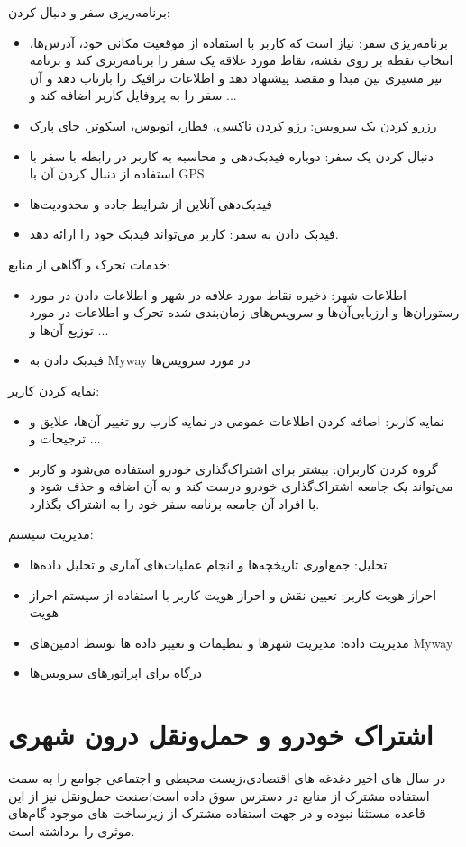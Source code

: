 برنامه‌ریزی سفر و دنبال کردن:
\begin{itemize}
\item
برنامه‌ریزی سفر: نیاز است که کاربر با استفاده از موقعیت مکانی خود، آدرس‌ها، انتخاب نقطه بر روی نقشه، نقاط مورد علاقه یک سفر را برنامه‌ریزی کند و برنامه نیز مسیری بین مبدا و مقصد پیشنهاد دهد و اطلاعات ترافیک را بازتاب دهد و  آن سفر را به پروفایل کاربر اضافه کند و ...
\item 
رزرو کردن یک سرویس: رزو کردن تاکسی، قطار، اتوبوس، اسکوتر، جای پارک 
\item
دنبال کردن یک سفر: دوباره فیدبک‌دهی و محاسبه به کاربر در رابطه با سفر با استفاده از دنبال کردن آن با GPS
\item
فیدبک‌دهی آنلاین از شرایط جاده و محدودیت‌ها
\item
فیدبک دادن به سفر: کاربر می‌تواند فیدبک خود را ارائه دهد.
\end{itemize}

خدمات تحرک و آگاهی از منابع: 
\begin{itemize}
\item
اطلاعات شهر: ذخیره نقاط مورد علافه در شهر و اطلاعات دادن در مورد رستوران‌ها و ارزیابی‌آن‌ها و سرویس‌های زمان‌بندی شده تحرک و اطلاعات در مورد توزیع آن‌ها و ...
\item
فیدبک دادن به Myway در مورد سرویس‌ها
\end{itemize}

نمایه کردن کاربر: 
\begin{itemize}
\item
نمایه کاربر: اضافه کردن اطلاعات عمومی در نمایه کارب رو تغییر آن‌ها، علایق و ترجیحات و ...
\item 
گروه کردن کاربران: بیشتر برای اشتراک‌گذاری خودرو استفاده می‌شود و کاربر می‌تواند یک جامعه اشتراک‌گذاری خودرو درست کند و به آن اضافه و حذف شود و با افراد آن جامعه برنامه سفر خود را به اشتراک بگذارد.
\end{itemize}

مدیریت سیستم:
\begin{itemize}
\item
تحلیل: جمع‌اوری تاریخچه‌ها و انجام عملیات‌های آماری و تحلیل داده‌ها 
\item
احراز هویت کاربر: تعیین نقش و احراز هویت کاربر با استفاده از سیستم احراز هویت
\item 
مدیریت داده: مدیریت شهر‌ها و تنظیمات و تغییر داده ها توسط ادمین‌های Myway
\item 
درگاه برای اپراتور‌های سرویس‌ها
\end{itemize}


\section{اشتراک خودرو و حمل‌و‌نقل درون شهری}
در سال های اخیر دغدغه های اقتصادی،‌زیست محیطی و اجتماعی جوامع را به سمت استفاده مشترک از منابع در دسترس سوق داده است؛صنعت حمل‌و‌نقل نیز از این قاعده مستثنا نبوده و در جهت استفاده مشترک از زیرساخت های موجود گام‌های موثری را برداشته است.

